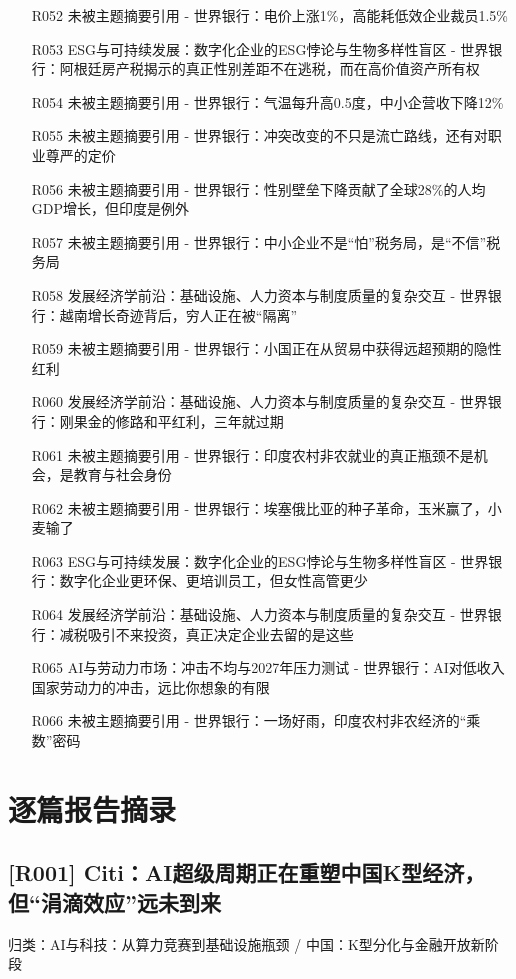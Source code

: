 \documentclass[11pt]{ctexart}
\begin{document}
\begin{itemize}
  \item [R052] 未被主题摘要引用 - 世界银行：电价上涨1\%，高能耗低效企业裁员1.5\%
  \item [R053] ESG与可持续发展：数字化企业的ESG悖论与生物多样性盲区 - 世界银行：阿根廷房产税揭示的真正性别差距不在逃税，而在高价值资产所有权
  \item [R054] 未被主题摘要引用 - 世界银行：气温每升高0.5度，中小企营收下降12\%
  \item [R055] 未被主题摘要引用 - 世界银行：冲突改变的不只是流亡路线，还有对职业尊严的定价
  \item [R056] 未被主题摘要引用 - 世界银行：性别壁垒下降贡献了全球28\%的人均GDP增长，但印度是例外
  \item [R057] 未被主题摘要引用 - 世界银行：中小企业不是“怕”税务局，是“不信”税务局
  \item [R058] 发展经济学前沿：基础设施、人力资本与制度质量的复杂交互 - 世界银行：越南增长奇迹背后，穷人正在被“隔离”
  \item [R059] 未被主题摘要引用 - 世界银行：小国正在从贸易中获得远超预期的隐性红利
  \item [R060] 发展经济学前沿：基础设施、人力资本与制度质量的复杂交互 - 世界银行：刚果金的修路和平红利，三年就过期
  \item [R061] 未被主题摘要引用 - 世界银行：印度农村非农就业的真正瓶颈不是机会，是教育与社会身份
  \item [R062] 未被主题摘要引用 - 世界银行：埃塞俄比亚的种子革命，玉米赢了，小麦输了
  \item [R063] ESG与可持续发展：数字化企业的ESG悖论与生物多样性盲区 - 世界银行：数字化企业更环保、更培训员工，但女性高管更少
  \item [R064] 发展经济学前沿：基础设施、人力资本与制度质量的复杂交互 - 世界银行：减税吸引不来投资，真正决定企业去留的是这些
  \item [R065] AI与劳动力市场：冲击不均与2027年压力测试 - 世界银行：AI对低收入国家劳动力的冲击，远比你想象的有限
  \item [R066] 未被主题摘要引用 - 世界银行：一场好雨，印度农村非农经济的“乘数”密码
\end{itemize}
\section{逐篇报告摘录}
\subsection{[R001] Citi：AI超级周期正在重塑中国K型经济，但“涓滴效应”远未到来}
{\small\color{refgray}归类：AI与科技：从算力竞赛到基础设施瓶颈 / 中国：K型分化与金融开放新阶段}
\end{document}
